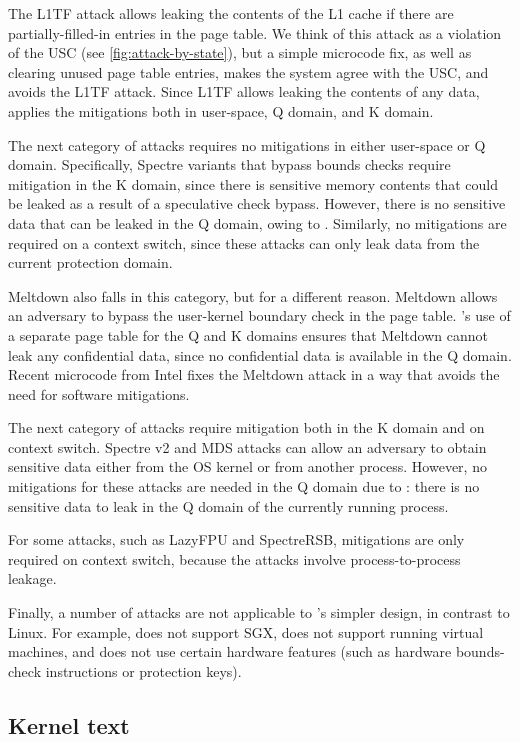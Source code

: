 The L1TF attack allows leaking the contents of the L1 cache if
there are partially-filled-in entries in the page table.  We think of
this attack as a violation of the USC (see \autoref{fig:attack-by-state}),
but a simple microcode fix, as well as clearing unused page table entries,
makes the system agree with the USC, and avoids the L1TF attack.  Since
L1TF allows leaking the contents of any data, \sys applies the mitigations
both in user-space, Q domain, and K domain.

The next category of attacks requires no mitigations in either user-space
or Q domain.  Specifically, Spectre variants that bypass bounds checks
require mitigation in the K domain, since there is sensitive memory
contents that could be leaked as a result of a speculative check bypass.
However, there is no sensitive data that can be leaked in the Q domain,
owing to \contract{}.  Similarly, no mitigations are required on a
context switch, since these attacks can only leak data from the current
protection domain.

Meltdown also falls in this category, but for a different reason.
Meltdown allows an adversary to bypass the user-kernel boundary check
in the page table.  \sys's use of a separate page table for the Q and
K domains ensures that Meltdown cannot leak any confidential data, since
no confidential data is available in the Q domain.  Recent microcode
from Intel fixes the Meltdown attack in a way that avoids the need for
software mitigations.

The next category of attacks require mitigation both in the K domain and
on context switch.  Spectre v2 and MDS attacks can allow an adversary to
obtain sensitive data either from the OS kernel or from another process.
However, no mitigations for these attacks are needed in the Q domain
due to \contract{}: there is no sensitive data to leak in the Q domain
of the currently running process.

For some attacks, such as LazyFPU and SpectreRSB, mitigations are only
required on context switch, because the attacks involve process-to-process
leakage.

Finally, a number of attacks are not applicable to \sys's simpler design,
in contrast to Linux.  For example, \sys does not support SGX, does
not support running virtual machines, and does not use certain hardware
features (such as hardware bounds-check instructions or protection keys).


\subsection*{Kernel text}
\label{ss:ktext}

